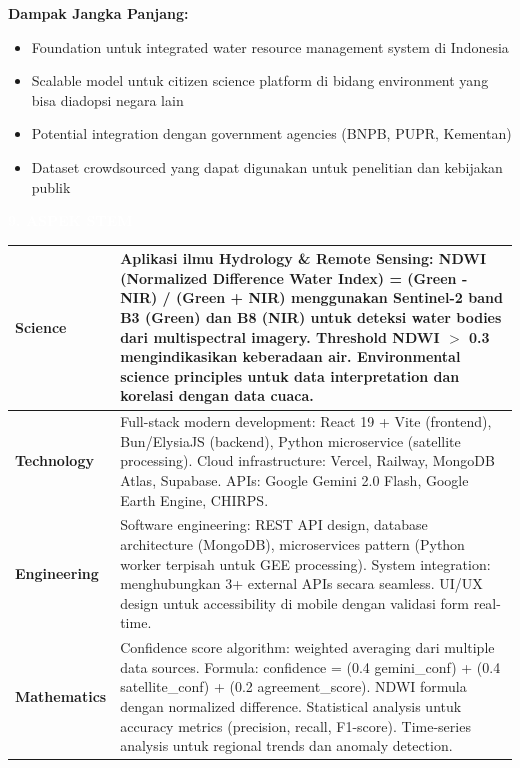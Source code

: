 \documentclass[12pt,a4paper]{article}
\newcommand{\sectionbox}[1]{%
  \colorbox{samsungblue}{%
    \parbox{\textwidth}{%
      \textcolor{white}{\large\bfseries #1}%
    }%
  }%
}
\newcommand{\subsectionbox}[1]{%
  \textbf{\large #1}\\[0.3cm]
}
\begin{document}
\subsectionbox{Dampak Jangka Panjang:}

\begin{itemize}
  \item Foundation untuk integrated water resource management system di Indonesia
  \item Scalable model untuk citizen science platform di bidang environment yang bisa diadopsi negara lain
  \item Potential integration dengan government agencies (BNPB, PUPR, Kementan)
  \item Dataset crowdsourced yang dapat digunakan untuk penelitian dan kebijakan publik
\end{itemize}

\vspace{1cm}

\sectionbox{9. ASPEK STEM}

\vspace{0.5cm}

\begin{tabularx}{\textwidth}{|l|X|}
  \hline
  \textbf{Science} &
    Aplikasi ilmu Hydrology \& Remote Sensing: NDWI (Normalized Difference Water Index) = (Green - NIR) / (Green + NIR) menggunakan Sentinel-2 band B3 (Green) dan B8 (NIR) untuk deteksi water bodies dari multispectral imagery. Threshold NDWI $>$ 0.3 mengindikasikan keberadaan air. Environmental science principles untuk data interpretation dan korelasi dengan data cuaca. \\[0.3cm]
  \hline
  \textbf{Technology} &
    Full-stack modern development: React 19 + Vite (frontend), Bun/ElysiaJS (backend), Python microservice (satellite processing). Cloud infrastructure: Vercel, Railway, MongoDB Atlas, Supabase.     APIs: Google Gemini 2.0 Flash, Google Earth Engine, CHIRPS. \\[0.3cm]
  \hline
  \textbf{Engineering} &
    Software engineering: REST API design, database architecture (MongoDB), microservices pattern (Python worker terpisah untuk GEE processing). System integration: menghubungkan 3+ external APIs secara seamless. UI/UX design untuk accessibility di mobile dengan validasi form real-time. \\[0.3cm]
  \hline
  \textbf{Mathematics} &
    Confidence score algorithm: weighted averaging dari multiple data sources. Formula: confidence = (0.4 \texttimes{} gemini\_conf) + (0.4 \texttimes{} satellite\_conf) + (0.2 \texttimes{} agreement\_score). NDWI formula dengan normalized difference. Statistical analysis untuk accuracy metrics (precision, recall, F1-score). Time-series analysis untuk regional trends dan anomaly detection. \\
  \hline
\end{tabularx}
\end{document}
